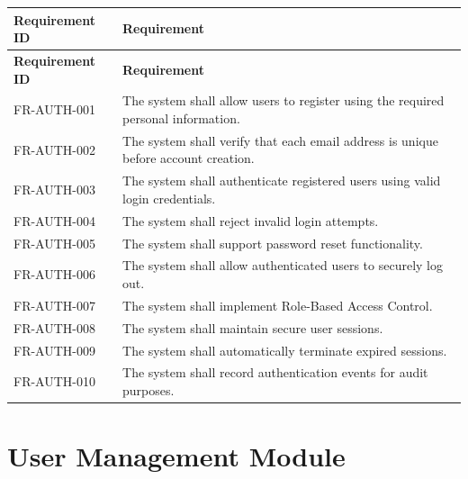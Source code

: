 \begin{longtable}{|p{2.8cm}|p{10.5cm}|}

\hline
\textbf{Requirement ID} &
\textbf{Requirement} \\
\hline
\endfirsthead

\hline
\textbf{Requirement ID} &
\textbf{Requirement} \\
\hline
\endhead

FR-AUTH-001 &
The system shall allow users to register using the required personal
information. \\
\hline

FR-AUTH-002 &
The system shall verify that each email address is unique before account
creation. \\
\hline

FR-AUTH-003 &
The system shall authenticate registered users using valid login
credentials. \\
\hline

FR-AUTH-004 &
The system shall reject invalid login attempts. \\
\hline

FR-AUTH-005 &
The system shall support password reset functionality. \\
\hline

FR-AUTH-006 &
The system shall allow authenticated users to securely log out. \\
\hline

FR-AUTH-007 &
The system shall implement Role-Based Access Control. \\
\hline

FR-AUTH-008 &
The system shall maintain secure user sessions. \\
\hline

FR-AUTH-009 &
The system shall automatically terminate expired sessions. \\
\hline

FR-AUTH-010 &
The system shall record authentication events for audit purposes. \\
\hline

\end{longtable}

\section{User Management Module}
\label{sec:user-management}

